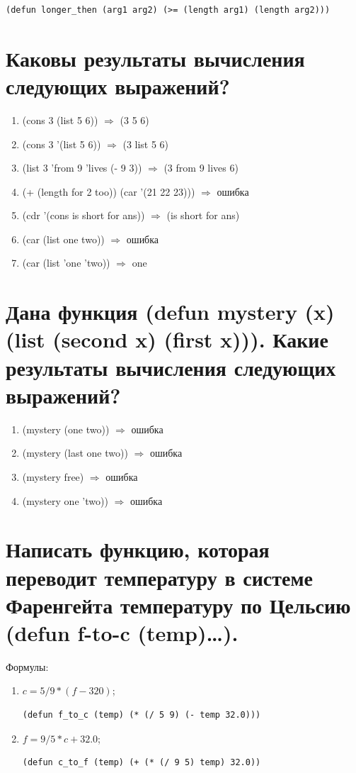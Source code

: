 \begin{lstlisting}[label=lst:task_5, caption=Задание 5.]
	(defun longer_then (arg1 arg2) (>= (length arg1) (length arg2)))
\end{lstlisting}

\section{Каковы результаты вычисления следующих выражений?}

\begin{enumerate}
	\item (cons 3 (list 5 6)) $\Rightarrow$ (3 5 6)
	\item (cons 3 '(list 5 6)) $\Rightarrow$ (3 list 5 6)
	\item (list 3 'from 9 'lives (- 9 3)) $\Rightarrow$ (3 from 9 lives 6)
	\item (+ (length for 2 too)) (car '(21 22 23))) $\Rightarrow$ ошибка 
	\item (cdr '(cons is short for ans)) $\Rightarrow$ (is short for ans)
	\item (car (list one two)) $\Rightarrow$ ошибка
	\item (car (list 'one 'two)) $\Rightarrow$ one
\end{enumerate}

\newpage
\section{Дана функция (defun mystery (x) (list (second x) (first x))). Какие результаты вычисления следующих выражений?}
\begin{enumerate}
	\item (mystery (one two)) $\Rightarrow$ ошибка
	\item (mystery (last one two)) $\Rightarrow$ ошибка
	\item (mystery free) $\Rightarrow$ ошибка
	\item (mystery one 'two)) $\Rightarrow$ ошибка
\end{enumerate}

\section{Написать функцию, которая переводит температуру в системе Фаренгейта температуру по Цельсию (defun f-to-c (temp)…).}

Формулы:

\begin{enumerate}
	\item $c = 5/9*(f-320)$;
	\begin{lstlisting}[caption=Перевод из Фаренгейт в Цельсий.]
	(defun f_to_c (temp) (* (/ 5 9) (- temp 32.0)))
	\end{lstlisting}
	
	\item $f = 9/5*c+32.0$;
	\begin{lstlisting}[caption=Перевод из Цельсия в Фаренгейт.]
	(defun c_to_f (temp) (+ (* (/ 9 5) temp) 32.0))
	\end{lstlisting}
\end{enumerate}


